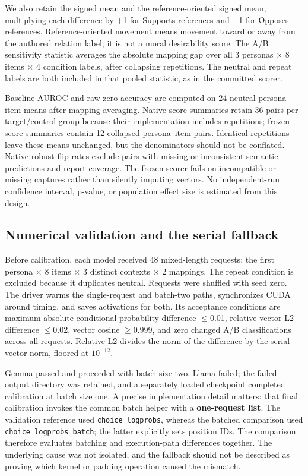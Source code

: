 We also retain the signed mean and the reference-oriented signed mean, multiplying each difference by +1 for Supports references and \ensuremath{-}1 for Opposes references. Reference-oriented movement means movement toward or away from the authored relation label; it is not a moral desirability score. The A/B sensitivity statistic averages the absolute mapping gap over all 3 personas \ensuremath{\times} 8 items \ensuremath{\times} 4 condition labels, after collapsing repetitions. The neutral and repeat labels are both included in that pooled statistic, as in the committed scorer.

Baseline AUROC and raw-zero accuracy are computed on 24 neutral persona--item means after mapping averaging. Native-score summaries retain 36 pairs per target/control group because their implementation includes repetitions; frozen-score summaries contain 12 collapsed persona--item pairs. Identical repetitions leave these means unchanged, but the denominators should not be conflated. Native robust-flip rates exclude pairs with missing or inconsistent semantic predictions and report coverage. The frozen scorer fails on incompatible or missing captures rather than silently imputing vectors. No independent-run confidence interval, p-value, or population effect size is estimated from this design.

\subsection{Numerical validation and the serial fallback}\label{numerical-validation-and-the-serial-fallback}

Before calibration, each model received 48 mixed-length requests: the first persona \ensuremath{\times} 8 items \ensuremath{\times} 3 distinct contexts \ensuremath{\times} 2 mappings. The repeat condition is excluded because it duplicates neutral. Requests were shuffled with seed zero. The driver warms the single-request and batch-two paths, synchronizes CUDA around timing, and saves activations for both. Its acceptance conditions are maximum absolute conditional-probability difference \ensuremath{\leq}0.01, relative vector L2 difference \ensuremath{\leq}0.02, vector cosine \ensuremath{\geq}0.999, and zero changed A/B classifications across all requests. Relative L2 divides the norm of the difference by the serial vector norm, floored at \(10^{-12}\).

Gemma passed and proceeded with batch size two. Llama failed; the failed output directory was retained, and a separately loaded checkpoint completed calibration at batch size one. A precise implementation detail matters: that final calibration invokes the common batch helper with a \textbf{one-request list}. The validation reference used \nolinkurl{choice_logprobs}, whereas the batched comparison used \nolinkurl{choice_logprobs_batch}; the latter explicitly sets position IDs. The comparison therefore evaluates batching and execution-path differences together. The underlying cause was not isolated, and the fallback should not be described as proving which kernel or padding operation caused the mismatch.


